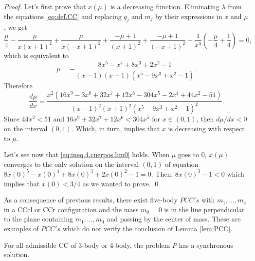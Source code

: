 \documentclass[smallcondensed]{svjour3}
\begin{document}
\begin{proof}
Let's first prove that $x(\mu)$ is a decreasing function. Eliminating $\lambda$ from the equations \eqref{eq:def.CC} and replacing $q_j$ and $m_j$ by their expressions in $x$ and $\mu$, we get
\[\frac{\mu}{4} - \frac{\mu}{x \left(x + 1\right)^{2}} + \frac{\mu}{x \left(- x + 1\right)^{2}} + \frac{- \mu + 1}{\left(x + 1\right)^{2}} + \frac{- \mu + 1}{\left(- x + 1\right)^{2}} - \frac{1}{x^{3}} \left(- \frac{\mu}{4} + \frac{1}{4}\right) = 0,\]
which is equivalent to
 \[\mu=- \frac{8 x^{5} - x^{4} + 8 x^{3} + 2 x^{2} - 1}{\left(x - 1\right) \left(x + 1\right) \left(x^{5} - 9 x^{3} + x^{2} - 1\right)}.\]
Therefore
\[
 \frac{d\mu}{dx}=\frac{x^{2} \left(16 x^{9} - 3 x^{8} + 32 x^{7} + 12 x^{6} - 304 x^{5} - 2 x^{4} + 44 x^{2} - 51\right)}{\left(x - 1\right)^{2} \left(x + 1\right)^{2} \left(x^{5} - 9 x^{3} + x^{2} - 1\right)^{2}}.
\]
Since $44x^2<51$ and $16 x^{9}  + 32 x^{7} + 12 x^{6} < 304 x^{5}$ for $x\in (0,1)$, then $d\mu/dx<0$ on the interval $ (0,1)$. Which, in turn, implies that $x$ is decreasing with respect to $\mu$.





Let's see now that \eqref{eq:ineq.4.cuerpos.lim0} holds. When $\mu$ goes to $0$, $x(\mu)$ converges to the only solution  on the interval $(0,1)$ of  equation $8 x(0)^{5} - x(0)^{4} + 8 x(0)^{3} + 2 x(0)^{2} - 1=0$.  Then,  $ 8 x(0)^{3} -1< 0$ which implies that $x(0)<3/4$ as we wanted to prove.
\qed\end{proof}


\begin{remark}
As a consequence of previous results, there exist five-body $PCC's$ with $m_1,\ldots,m_4$  in a CCcl or CCr configuration and the mass $m_0=0$ is in the  line perpendicular to the  plane containing $m_1,\ldots,m_4$ and passing by the center of mass. These are examples of $PCC's$ which do not verify the conclusion of Lemma \ref{lem:PCC}.
\end{remark}


\begin{corollary}
For all  admissible CC of 3-body or 4-body, the  problem $P$ has a synchronous solution.
\end{corollary}
\end{document}
